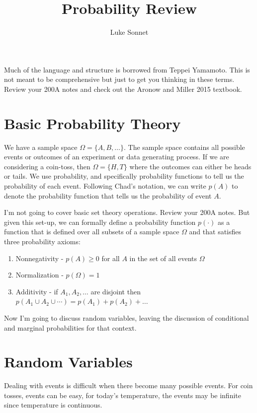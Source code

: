 \documentclass{article} %
\author{Luke Sonnet}
\title{Probability Review}
\newcommand*\red{\color{red}}  %
\begin{document}
\singlespacing
\maketitle %
\onehalfspacing

Much of the language and structure is borrowed from Teppei Yamamoto. This is not meant to be comprehensive but just to get you thinking in these terms. Review your 200A notes and check out the Aronow and Miller 2015 textbook.

\section{Basic Probability Theory}

We have a {\red sample space} $\Omega = \{A, B, \dots\}$. The sample space contains all possible events or outcomes of an experiment or data generating process. If we are considering a coin-toss, then $\Omega = \{H, T\}$ where the outcomes can either be heads or tails. We use probability, and specifically {\red probability functions} to tell us the probability of each event. Following Chad's notation, we can write $p(A)$ to denote the probability function that tells us the probability of event $A$.

I'm not going to cover basic set theory operations. Review your 200A notes. But given this set-up, we can formally define a probability function $p(\cdot)$ as a function that is defined over all subsets of a sample space $\Omega$ and that satisfies three probability axioms:

\begin{enumerate}
	\item {\red Nonnegativity} - $p(A) \geq 0$ for all $A$ in the set of all events $\Omega$
	\item {\red Normalization} - $p(\Omega) = 1$
	\item {\red Additivity} - if $A_1, A_2, \dots$ are disjoint then $p(A_1 \cup A_2 \cup \cdots ) = p(A_1) + p(A_2) + \dots$
\end{enumerate}

Now I'm going to discuss random variables, leaving the discussion of conditional and marginal probabilities for that context.

\section{Random Variables}

Dealing with events is difficult when there become many possible events. For coin tosses, events can be easy, for today's temperature, the events may be infinite since temperature is continuous. 
\end{document}
